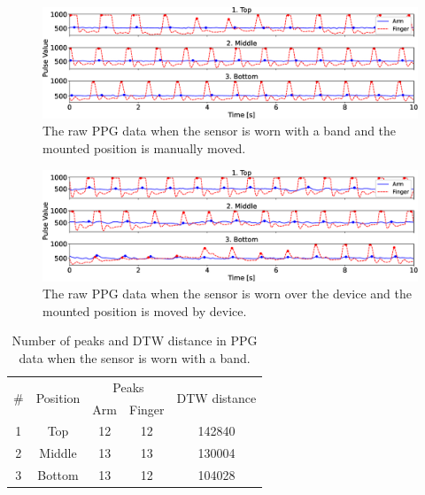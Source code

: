 \documentclass[sigconf]{acmart}
\begin{document}
\begin{figure}[!t]
  \centering
  \includegraphics[width=1\linewidth]{figures/manual.eps}
  \caption{The raw PPG data when the sensor is worn with a band and the mounted position is manually moved.}
  \label{fig:manual}
\end{figure}

\begin{figure}[!t]
  \centering
  \includegraphics[width=1\linewidth]{figures/auto.eps}
  \caption{The raw PPG data when the sensor is worn over the device and the mounted position is moved by device.}
  \label{fig:auto}
\end{figure}

\begin{table}[!t]
  \small
  \centering
  \caption{Number of peaks and DTW distance in PPG data when the sensor is worn with a band.}
  \begin{tabular}{c|c|cc|c} \hline\hline
    \multirow{2}{*}{\#} & \multirow{2}{*}{Position} & \multicolumn{2}{c|}{Peaks} & \multirow{2}{*}{DTW distance} \\ \cline{3-4}
     &                   & Arm & Finger & \\ \hline
    1 & Top & 12 & 12 & 142840 \\
    2 & Middle & 13 & 13 & 130004 \\
    3 & Bottom & 13 & 12 & 104028 \\ \hline
  \end{tabular}
  \label{tab:manual}
\end{table}
\end{document}
